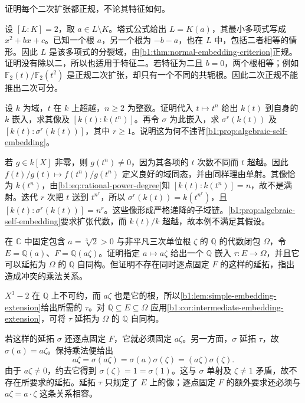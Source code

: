 \begin{exercise}\label{b1:ex:15-9}
	证明每个二次扩张都正规，不论其特征如何。
\end{exercise}
\begin{solution}
	设 \([L:K]=2\)，取 \(a\in L\setminus K\)。塔式公式给出 \(L=K(a)\)，其最小多项式写成 \(x^2+bx+c\)。已知一个根 \(a\)，另一个根为 \(-b-a\)，也在 \(L\) 中，包括二者相等的情形。因此 \(L\) 是该多项式的分裂域，由\cref{b1:thm:normal-embedding-criterion}正规。证明没有除以二，所以也适用于特征二。若特征为二且 \(b=0\)，两个根相等；例如 \(\mathbb F_2(t)/\mathbb F_2(t^2)\) 是正规二次扩张，却只有一个不同的共轭根。因此二次正规不能推出二次可分。
\end{solution}

\begin{exercise}\label{b1:ex:15-10}
	设 \(k\) 为域，\(t\) 在 \(k\) 上超越，\(n\geq2\) 为整数。证明代入 \(t\mapsto t^n\) 给出 \(k(t)\) 到自身的 \(k\) 嵌入，求其像及 \([k(t):k(t^n)]\)。再令 \(\sigma\) 为此嵌入，求 \(\sigma^r(k(t))\) 及 \([k(t):\sigma^r(k(t))]\)，其中 \(r\geq1\)。说明这为何不违背\cref{b1:prop:algebraic-self-embedding}。
\end{exercise}
\begin{solution}
	若 \(g\in k[X]\) 非零，则 \(g(t^n)\neq0\)，因为其各项的 \(t\) 次数不同而 \(t\) 超越。因此 \(f(t)/g(t)\mapsto f(t^n)/g(t^n)\) 定义良好的域同态，并由同样理由单射。其像恰为 \(k(t^n)\)，由\eqref{b1:eq:rational-power-degree}知 \([k(t):k(t^n)]=n\)，故不是满射。迭代 \(r\) 次把 \(t\) 送到 \(t^{n^r}\)，所以 \(\sigma^r(k(t))=k(t^{n^r})\)，且 \([k(t):\sigma^r(k(t))]=n^r\)。这些像形成严格递降的子域链。\cref{b1:prop:algebraic-self-embedding}要求扩张代数，而 \(k(t)/k\) 超越，故本例不满足其假设。
\end{solution}

\begin{exercise}\label{b1:ex:15-11}
	在 \(\mathbb C\) 中固定包含 \(a=\sqrt[3]2>0\) 与非平凡三次单位根 \(\zeta\) 的 \(\mathbb Q\) 的代数闭包 \(\Omega\)，令 \(E=\mathbb Q(a)\)、\(F=\mathbb Q(a\zeta)\)。证明指定 \(a\mapsto a\zeta\) 给出一个 \(\mathbb Q\) 嵌入 \(\tau:E\rightarrow\Omega\)，并且它可以延拓为 \(\Omega\) 的 \(\mathbb Q\) 自同构。但证明不存在同时逐点固定 \(F\) 的这样的延拓，指出造成冲突的乘法关系。
\end{exercise}
\begin{solution}
	\(X^3-2\) 在 \(\mathbb Q\) 上不可约，而 \(a\zeta\) 也是它的根，所以\cref{b1:lem:simple-embedding-extension}给出所需的 \(\tau\)。对 \(\mathbb Q\subseteq E\subseteq\Omega\) 应用\cref{b1:cor:intermediate-embedding-extension}，可将 \(\tau\) 延拓为 \(\Omega\) 的 \(\mathbb Q\) 自同构。

	若这样的延拓 \(\sigma\) 还逐点固定 \(F\)，它就必须固定 \(a\zeta\)。另一方面，\(\sigma\) 延拓 \(\tau\)，故 \(\sigma(a)=a\zeta\)。保持乘法便给出
	\[
		a\zeta=\sigma(a\zeta)=\sigma(a)\sigma(\zeta) =(a\zeta)\sigma(\zeta).
	\]
	由于 \(a\zeta\neq0\)，约去它得到 \(\sigma(\zeta)=1=\sigma(1)\)。这与 \(\sigma\) 单射及 \(\zeta\neq1\) 矛盾，故不存在所要求的延拓。延拓 \(\tau\) 只规定了 \(E\) 上的像；逐点固定 \(F\) 的额外要求还必须与 \(a\zeta=a\cdot\zeta\) 这条关系相容。
\end{solution}

